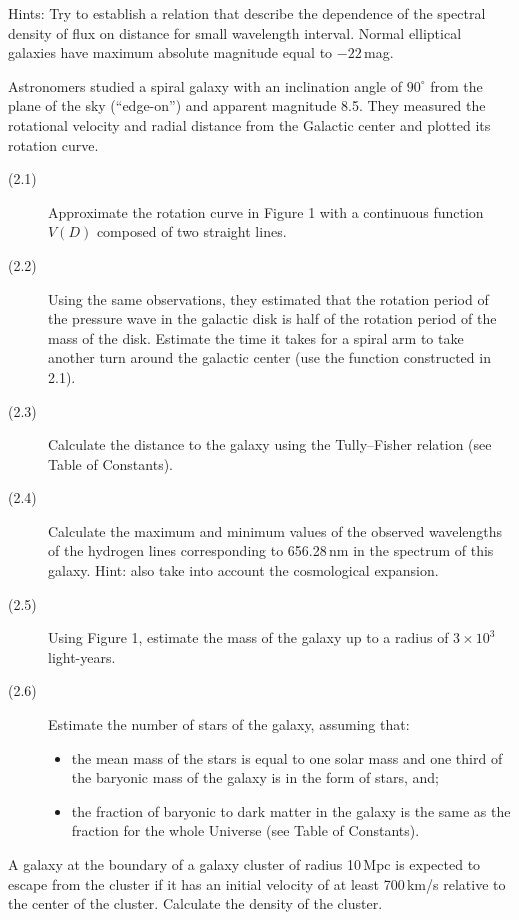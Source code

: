 Hints: Try to establish a relation that describe the dependence of the spectral
density of flux on distance for small wavelength interval. Normal elliptical
galaxies have maximum absolute magnitude equal to $-22$\,mag.

Astronomers studied a spiral galaxy with an inclination angle of $90^\circ$
from the plane of the sky (``edge-on'') and apparent magnitude 8.5. They
measured the rotational velocity and radial distance from the Galactic center
and plotted its rotation curve.

\begin{description}
\item[(2.1)] Approximate the rotation curve in Figure 1 with a continuous
  function $V(D)$ composed of two straight lines.
\item[(2.2)] Using the same observations, they estimated that the rotation
  period of the pressure wave in the galactic disk is half of the rotation
  period of the mass of the disk. Estimate the time it takes for a spiral arm
  to take another turn around the galactic center (use the function
  constructed in 2.1).
\item[(2.3)] Calculate the distance to the galaxy using the Tully--Fisher
  relation (see Table of Constants).
\item[(2.4)] Calculate the maximum and minimum values of the observed
  wavelengths of the hydrogen lines corresponding to 656.28\,nm in the
  spectrum of this galaxy. Hint: also take into account the cosmological
  expansion.
\item[(2.5)] Using Figure 1, estimate the mass of the galaxy up to a radius of
  $3 \times 10^3$ light-years.
\item[(2.6)] Estimate the number of stars of the galaxy, assuming that:
  \begin{itemize}
  \item the mean mass of the stars is equal to one solar mass and one third of
    the baryonic mass of the galaxy is in the form of stars, and;
  \item the fraction of baryonic to dark matter in the galaxy is the same as
    the fraction for the whole Universe (see Table of Constants).
  \end{itemize}
\end{description}

A galaxy at the boundary of a galaxy cluster of radius 10\,Mpc is expected to
escape from the cluster if it has an initial velocity of at least 700\,km/s
relative to the center of the cluster. Calculate the density of the cluster.

